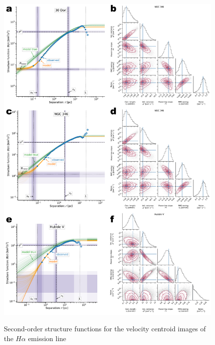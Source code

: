 \documentclass[fleqn,usenatbib, useAMS, a4paper]{mnras}
\begin{document}
\begin{figure}
  \centering
  \includegraphics[width=0.8\linewidth]{Figures/strucfunc-fit-B}
  \label{fig:strucfunc-fit-B}
  \caption{Second-order structure functions for the velocity centroid images of the \(H\alpha\) emission line}
\end{figure}
\end{document}

